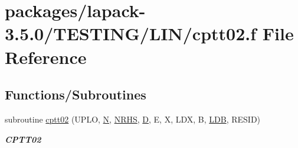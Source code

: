 \hypertarget{cptt02_8f}{}\section{packages/lapack-\/3.5.0/\+T\+E\+S\+T\+I\+N\+G/\+L\+I\+N/cptt02.f File Reference}
\label{cptt02_8f}
\subsection*{Functions/\+Subroutines}
\begin{DoxyCompactItemize}
\item 
subroutine \hyperlink{group__complex__lin_gaea2235767e026ff256f32cd6d940eeaf}{cptt02} (U\+P\+L\+O, \hyperlink{polmisc_8c_a0240ac851181b84ac374872dc5434ee4}{N}, \hyperlink{example__user_8c_aa0138da002ce2a90360df2f521eb3198}{N\+R\+H\+S}, \hyperlink{odrpack_8h_a7dae6ea403d00f3687f24a874e67d139}{D}, E, X, L\+D\+X, B, \hyperlink{example__user_8c_a50e90a7104df172b5a89a06c47fcca04}{L\+D\+B}, R\+E\+S\+I\+D)
\begin{DoxyCompactList}\small\item\em {\bfseries C\+P\+T\+T02} \end{DoxyCompactList}\end{DoxyCompactItemize}
